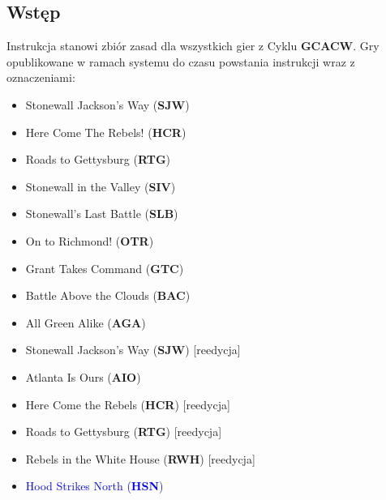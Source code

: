 \documentclass[10pt,twoside,a4paper,table]{article}
\begin{document}
\begin{multicols*}{2}
				
	\section{Wstęp}
				
	Instrukcja stanowi zbiór zasad dla wszystkich gier z Cyklu \textbf{GCACW}. Gry opublikowane w ramach systemu do czasu powstania instrukcji wraz z oznaczeniami:
	\begin{itemize}
		\item Stonewall Jackson’s Way (\textbf{SJW})
		\item Here Come The Rebels! (\textbf{HCR})
		\item Roads to Gettysburg (\textbf{RTG})
		\item Stonewall in the Valley (\textbf{SIV})
		\item Stonewall’s Last Battle (\textbf{SLB})
		\item On to Richmond! (\textbf{OTR})
		\item Grant Takes Command (\textbf{GTC})
		\item Battle Above the Clouds (\textbf{BAC})
		\item All Green Alike (\textbf{AGA})
		\item Stonewall Jackson’s Way (\textbf{SJW}) [reedycja]
		\item Atlanta Is Ours (\textbf{AIO})
		\item Here Come the Rebels\! (\textbf{HCR}) [reedycja]
		\item Roads to Gettysburg (\textbf{RTG}) [reedycja]
		\item Rebels in the White House (\textbf{RWH}) [reedycja]
		\item \textcolor{blue}{Hood Strikes North (\textbf{HSN})}
		      		      		      		      

\end{itemize}
\end{multicols*}
\end{document}
